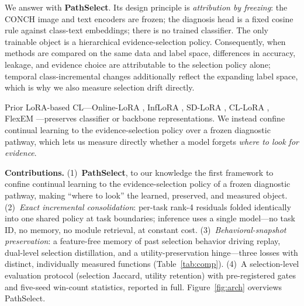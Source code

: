 \documentclass{article}
\begin{document}
We answer with \textbf{PathSelect}. Its design principle is \emph{attribution by freezing}: the CONCH image and text encoders \cite{lu2024conch} are frozen; the diagnosis head is a fixed cosine rule against class-text embeddings; there is no trained classifier. The only trainable object is a hierarchical evidence-selection policy. Consequently, when methods are compared on the same data and label space, differences in accuracy, leakage, and evidence choice are attributable to the selection policy alone; temporal class-incremental changes additionally reflect the expanding label space, which is why we also measure selection drift directly.

Prior LoRA-based CL---Online-LoRA \cite{wei2025onlinelora}, InfLoRA \cite{liang2024inflora}, SD-LoRA \cite{wu2025sdlora}, CL-LoRA \cite{he2025cllora}, FlexEM \cite{chen2026flexem}---preserves classifier or backbone representations. We instead confine continual learning to the evidence-selection policy over a frozen diagnostic pathway, which lets us measure directly whether a model forgets \emph{where to look for evidence}.

\textbf{Contributions.}
(1)~\textbf{PathSelect}, to our knowledge the first framework to confine continual learning to the evidence-selection policy of a frozen diagnostic pathway, making ``where to look'' the learned, preserved, and measured object.
(2)~\emph{Exact incremental consolidation}: per-task rank-4 residuals folded identically into one shared policy at task boundaries; inference uses a single model---no task ID, no memory, no module retrieval, at constant cost.
(3)~\emph{Behavioral-snapshot preservation}: a feature-free memory of past selection behavior driving replay, dual-level selection distillation, and a utility-preservation hinge---three losses with distinct, individually measured functions (Table~\ref{tab:comp}).
(4)~A selection-level evaluation protocol (selection Jaccard, utility retention) with pre-registered gates and five-seed win-count statistics, reported in full. Figure~\ref{fig:arch} overviews PathSelect.
\end{document}
